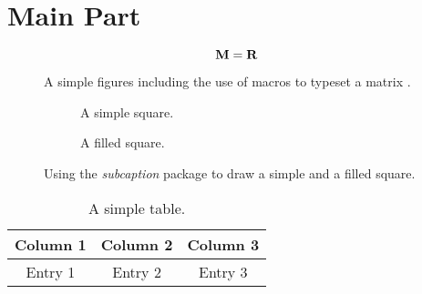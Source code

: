 
\section{Main Part}

\lipsum[11-13]

\begin{equation}
    \mathbf{M} = \mathbf{R}
\end{equation}

\begin{figure}[t]
    \centering
    
    \caption{A simple figures including the use of macros to typeset a matrix \Mmat.}
    \label{fig:matrix}
\end{figure}

\lipsum[14-15]

\begin{figure}[t]
    \centering
    \begin{subfigure}[b]{0.49\textwidth}
        \centering
        
        \caption{A simple square.}
        \label{fig:squareSimple}
    \end{subfigure}
    \begin{subfigure}[b]{0.49\textwidth}
        \centering
        
        \caption{A filled square.}
        \label{fig:squareFilled}
    \end{subfigure}
    \caption{Using the \emph{subcaption} package to draw a simple and a filled square.}
    \label{fig:squares}
\end{figure}

\lipsum[16-17]

\begin{table}[t]
    \centering
    \begin{tabular}{ccc}\toprule
        Column 1 & Column 2 & Column 3\\\bottomrule\toprule
        Entry 1  & Entry 2  & Entry 3 \\\bottomrule
    \end{tabular}
    \caption{A simple table.}
    \label{tab:table}
\end{table}

\lipsum[17-18]

